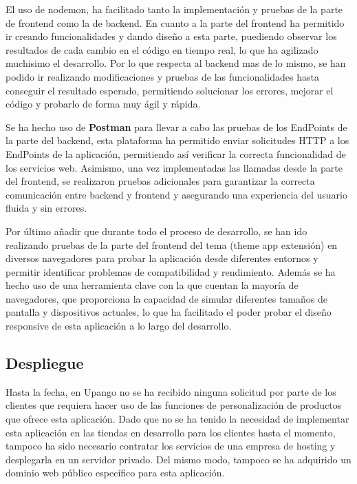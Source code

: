 \documentclass[12pt]{article}
\begin{document}
El uso de nodemon, ha facilitado tanto la implementación y pruebas de la parte de frontend como la de backend. En cuanto a la parte del frontend
ha permitido ir creando funcionalidades y dando diseño a esta parte, puediendo observar los resultados de cada cambio en el código en tiempo real,
lo que ha agilizado muchisimo el desarrollo. Por lo que respecta al backend mas de lo mismo, se han podido ir realizando modificaciones y pruebas de las funcionalidades
hasta conseguir el resultado esperado, permitiendo solucionar los errores, mejorar el código y probarlo de forma muy ágil y rápida. 

Se ha hecho uso de \textbf{Postman} para llevar a cabo las pruebas de los EndPoints de la parte del backend, esta plataforma ha permitido enviar 
solicitudes HTTP a los EndPoints de la aplicación, permitiendo así verificar la correcta funcionalidad de los servicios web. Asimismo, una vez implementadas
las llamadas desde la parte del frontend, se realizaron pruebas adicionales para garantizar la correcta comunicación entre backend y frontend y asegurando una
experiencia del usuario fluida y sin errores.

Por último añadir que durante todo el proceso de desarrollo, se han ido realizando pruebas de la parte del frontend del tema (theme app extensión) en diversos
navegadores para probar la aplicación desde diferentes entornos y permitir identificar problemas de compatibilidad y rendimiento.
Además se ha hecho uso de una herramienta clave con la que cuentan la mayoría de navegadores, que proporciona la capacidad de simular diferentes 
tamaños de pantalla y dispositivos actuales, lo que ha facilitado el poder probar el diseño responsive de esta aplicación a lo largo del desarrollo.

\subsection{Despliegue}
Hasta la fecha, en Upango no se ha recibido ninguna solicitud por parte de los clientes que requiera hacer uso de las funciones de personalización de productos
que ofrece esta aplicación. Dado que no se ha tenido la necesidad de implementar esta aplicación en las tiendas en desarrollo para los clientes hasta el momento, tampoco ha sido 
necesario contratar los servicios de una empresa de hosting y desplegarla en un servidor privado. Del mismo modo, tampoco se ha adquirido un dominio web público 
específico para esta aplicación.
\end{document}
